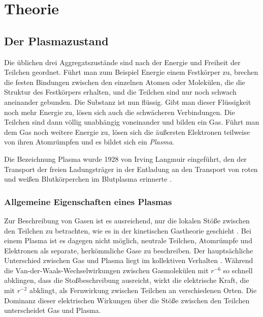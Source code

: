 \chapter{Theorie}


\section{Der Plasmazustand}

Die üblichen drei Aggregatszustände sind nach der Energie und \glqq{}Freiheit\grqq{} der Teilchen geordnet. Führt man zum Beispiel Energie einem Festkörper zu, brechen die festen Bindungen zwischen den einzelnen Atomen oder Molekülen, die die Struktur des Festkörpers erhalten, und die Teilchen sind nur noch schwach aneinander gebunden. Die Substanz ist nun flüssig. Gibt man dieser Flüssigkeit noch mehr Energie zu, lösen sich auch die schwächeren Verbindungen. Die Teilchen sind dann völlig unabhängig voneinander und bilden ein Gas. Führt man dem Gas noch weitere Energie zu, lösen sich die äußersten Elektronen teilweise von ihren Atomrümpfen und es bildet sich ein \textit{Plasma}. 

Die Bezeichnung \glqq{}Plasma\grqq{} wurde 1928 von Irving Langmuir eingeführt, den der Transport der freien Ladungsträger in der Entladung an den Transport von roten und weißen Blutkörperchen im Blutplasma erinnerte \cite{langmuirOscillationsIonizedGases1928,hirshGaseousElectronics2012}.

\subsection{Allgemeine Eigenschaften eines Plasmas}

Zur Beschreibung von Gasen ist es ausreichend, nur die lokalen Stöße zwischen den Teilchen zu betrachten, wie es in der kinetischen Gastheorie geschieht \cite{feynmanrichardpFeynmanLecturesPhysics1964}. Bei einem Plasma ist es dagegen nicht möglich, neutrale Teilchen, Atomrümpfe und Elektronen als separate, herkömmliche Gase zu beschreiben. Der hauptsächliche Unterschied zwischen Gas und Plasma liegt im kollektiven Verhalten \cite{pielPlasmaPhysicsIntroduction2010}. Während die Van-der-Waals-Wechselwirkungen zwischen Gasmolekülen mit $ r^{-6} $ so schnell abklingen, dass die Stoßbeschreibung ausreicht, wirkt die elektrische Kraft, die mit $ r^{-2} $ abklingt, als Fernwirkung zwischen Teilchen an verschiedenen Orten. Die Dominanz dieser elektrischen Wirkungen über die Stöße zwischen den Teilchen unterscheidet Gas und Plasma.

